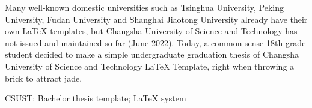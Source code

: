 \begin{abstract}

清华北大、复旦上交等众多国内知名大学早已拥有自己的 \LaTeX 模板，而长沙理工大学至今（2022年6月）无人发起与维护。今日某长理 18 级学子决定制作一份简陋的长沙理工大学本科生毕业论文 \LaTeX
模板，权当抛砖引玉。

 长沙理工大学；本科生毕业论文模板；\LaTeX 系统
\end{abstract}

\begin{abstract*}
  
Many well-known domestic universities such as Tsinghua University, Peking University, Fudan University and Shanghai Jiaotong University already have their own \LaTeX{} templates, but Changsha University of Science and Technology has not issued and maintained so far (June 2022). Today, a common sense 18th grade student decided to make a simple undergraduate graduation thesis of Changsha University of Science and Technology \LaTeX
Template, right when throwing a brick to attract jade.
  
 CSUST; Bachelor thesis template; \LaTeX{} system
\end{abstract*}













    



